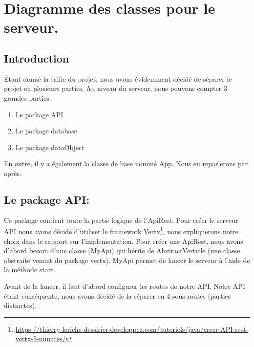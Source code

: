 \section{Diagramme des classes pour le serveur.}

\subsection{Introduction}
\begin{flushleft}
Étant donné la taille du projet, nous avons évidemment décidé de séparer le projet en plusieurs parties. Au niveau du serveur, nous pouvons compter 3 grandes parties.
\end{flushleft}

\begin{enumerate}[-]
\item Le package API
\item Le package database
\item Le package dataObject
\end{enumerate}

\begin{flushleft}
En outre, il y a également la classe de base nommé App. Nous en reparlerons par après.
\end{flushleft}
\newpage
\subsection{Le package API:}

\begin{flushleft}
Ce package contient toute la partie logique de l'ApiRest. Pour créer le serveur API nous avons décidé d'utiliser le framework Vertx\footnote{\url{https://thierry-leriche-dessirier.developpez.com/tutoriels/java/creer-API-rest-vertx-5-minutes/}}, nous expliquerons notre choix dans le rapport sur l'implementation. Pour créer une ApiRest, nous avons d'abord besoin d'une classe (MyApi) qui hérite de AbstractVerticle (une classe abstraite venant du package vertx). MyApi permet de lancer le serveur à l'aide de la méthode start.
\end{flushleft}

\begin{flushleft}
Avant de la lancer, il faut d'abord configurer les routes de notre API. Notre API étant conséquente, nous avons décidé de la séparer en 4 sous-routes (parties distinctes).
\end{flushleft}

